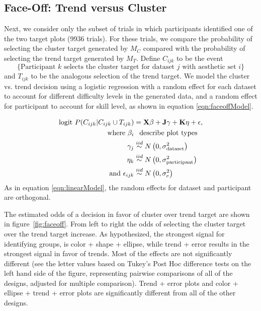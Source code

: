 \documentclass[11pt]{isuthesis}\usepackage[]{graphicx}\usepackage[]{color}
\begin{document}
\subsection{Face-Off: Trend versus Cluster}
Next, we consider only the subset of trials in which participants identified one of the two target plots (9936 trials). For these trials, we compare the probability of selecting the cluster target generated by $M_C$ compared with the probability of selecting the trend target generated by $M_T$. 
Define $C_{ijk}$ to be the event $$\{\text{Participant }k\text{ selects the cluster target for dataset }j\text{ with aesthetic set }i\}$$
and $T_{ijk}$ to be the analogous selection of the trend target.
We model the cluster vs. trend decision using a logistic regression with a random effect for each dataset to account for different difficulty levels in the generated data, and a random effect for participant to account for skill level, as shown in equation \ref{eqn:faceoffModel}. 

\begin{align}
\text{logit }P(C_{ijk} | C_{ijk}\cup T_{ijk}) & =  \textbf{X}\beta + \textbf{J}\gamma + \textbf{K}\eta + \epsilon, \label{eqn:faceoffModel}\\
\text{where } \beta_i & \hphantom{\sim} \text{describe plot types}\nonumber\\
\hphantom{where } \gamma_j & \overset{iid}{\sim} N\left(0, \sigma^2_{\text{dataset}}\nonumber\right)\\
\hphantom{where } \eta_k & \overset{iid}{\sim} N\left(0, \sigma^2_{\text{participant}}\nonumber\right)\\
\text{and } \epsilon_{ijk} & \overset{iid}{\sim}  N\left(0, \sigma^2_e\right)\nonumber
\end{align}
As in equation \ref{eqn:linearModel}, the random effects for dataset and participant are orthogonal. 

The estimated odds of a decision in favor of cluster over trend target are shown in figure~\ref{fig:faceoff}. From left to right the odds of selecting the cluster target over the trend target increase. As hypothesized, the strongest signal for identifying groups, is color + shape + ellipse, while trend + error results in the strongest signal in favor of trends. Most of the effects are not significantly different (see the letter values \cite{piepho:04} based on Tukey's Post Hoc difference tests on the left hand side of the figure, representing pairwise comparisons of all of the designs, adjusted for multiple comparison). Trend + error plots and color + ellipse + trend + error plots are significantly different from all of the other designs. 
\end{document}

